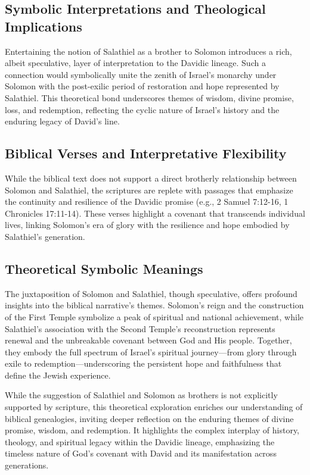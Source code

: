 \subsection{Symbolic Interpretations and Theological Implications}

Entertaining the notion of Salathiel as a brother to Solomon introduces a rich, albeit speculative, layer of interpretation to the Davidic lineage. Such a connection would symbolically unite the zenith of Israel's monarchy under Solomon with the post-exilic period of restoration and hope represented by Salathiel. This theoretical bond underscores themes of wisdom, divine promise, loss, and redemption, reflecting the cyclic nature of Israel's history and the enduring legacy of David's line.

\subsection{Biblical Verses and Interpretative Flexibility}

While the biblical text does not support a direct brotherly relationship between Solomon and Salathiel, the scriptures are replete with passages that emphasize the continuity and resilience of the Davidic promise (e.g., 2 Samuel 7:12-16, 1 Chronicles 17:11-14). These verses highlight a covenant that transcends individual lives, linking Solomon's era of glory with the resilience and hope embodied by Salathiel's generation.

\subsection{Theoretical Symbolic Meanings}

The juxtaposition of Solomon and Salathiel, though speculative, offers profound insights into the biblical narrative's themes. Solomon's reign and the construction of the First Temple symbolize a peak of spiritual and national achievement, while Salathiel's association with the Second Temple's reconstruction represents renewal and the unbreakable covenant between God and His people. Together, they embody the full spectrum of Israel's spiritual journey—from glory through exile to redemption—underscoring the persistent hope and faithfulness that define the Jewish experience.


While the suggestion of Salathiel and Solomon as brothers is not explicitly supported by scripture, this theoretical exploration enriches our understanding of biblical genealogies, inviting deeper reflection on the enduring themes of divine promise, wisdom, and redemption. It highlights the complex interplay of history, theology, and spiritual legacy within the Davidic lineage, emphasizing the timeless nature of God's covenant with David and its manifestation across generations.


